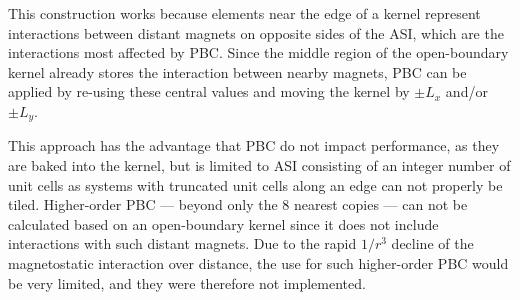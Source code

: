 
This construction works because elements near the edge of a kernel represent interactions between distant magnets on opposite sides of the ASI, which are the interactions most affected by PBC.
Since the middle region of the open-boundary kernel already stores the interaction between nearby magnets, PBC can be applied by re-using these central values and moving the kernel by $\pm L_x$ and/or $\pm L_y$. \\\par

This approach has the advantage that PBC do not impact performance, as they are baked into the kernel, but is limited to ASI consisting of an integer number of unit cells as systems with truncated unit cells along an edge can not properly be tiled.
Higher-order PBC --- beyond only the 8 nearest copies --- can not be calculated based on an open-boundary kernel since it does not include interactions with such distant magnets.
Due to the rapid $1/r^3$ decline of the magnetostatic interaction over distance, the use for such higher-order PBC would be very limited, and they were therefore not implemented.

